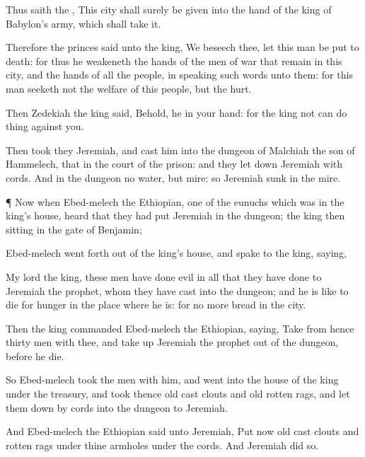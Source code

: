{Thus
saith the
{}, This
city shall
surely be
given into the
hand of the
king of
Babylon’s
army, which shall
take it.

Therefore the
princes
said unto the
king, We beseech thee, let this
man be put to
death: for
thus he
weakeneth the
hands of the
men of
war that
remain in this
city, and the
hands of all the
people, in
speaking such
words unto them: for this
man
seeketh not the
welfare of this
people, but the
hurt.

Then
Zedekiah the
king
said, Behold, he
{} in your
hand: for the
king
{} not
{}
can do
{}
thing against you.

Then
took they
Jeremiah, and
cast him into the
dungeon of
Malchiah the
son of
Hammelech, that
{} in the
court of the
prison: and they let
down
Jeremiah with
cords. And in the
dungeon
{} no
water, but
mire: so
Jeremiah
sunk in the
mire.


\par }{\PP {}¶ Now when
Ebed-melech the
Ethiopian,
one of the
eunuchs which was in the
king’s
house,
heard that they had
put
Jeremiah in the
dungeon; the
king then
sitting in the
gate of
Benjamin;

Ebed-melech went
forth out of the
king’s
house, and
spake to the
king,
saying,

My
lord the
king, these
men have done
evil in all that they have
done to
Jeremiah the
prophet, whom they have
cast into the
dungeon; and he is like to
die
for
hunger in the
place where he is: for
{} no more
bread in the
city.

Then the
king
commanded
Ebed-melech the
Ethiopian,
saying,
Take from hence
thirty
men with
thee, and take
up
Jeremiah the
prophet out of the
dungeon, before he
die.

So
Ebed-melech
took the
men with
him, and
went into the
house of the
king under the
treasury, and
took thence
old cast
clouts and
old rotten
rags, and let them
down by
cords into the
dungeon to
Jeremiah.

And
Ebed-melech the
Ethiopian
said unto
Jeremiah,
Put now
{}
old cast
clouts and rotten
rags under thine
armholes under the
cords. And
Jeremiah
did so.

}
